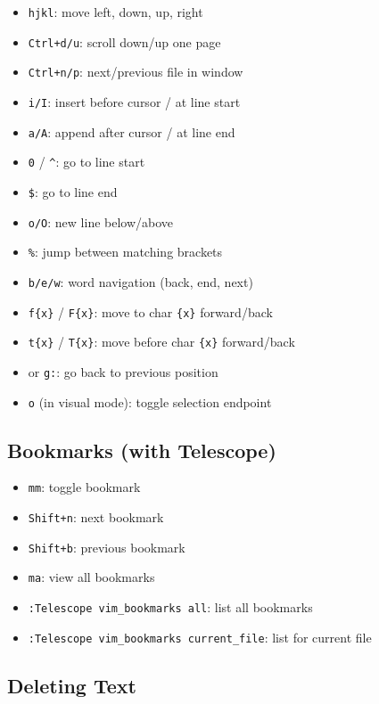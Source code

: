 \documentclass[
  letterpaper,
  DIV=11,
  numbers=noendperiod]{scrartcl}
\providecommand{\tightlist}{%
  \setlength{\itemsep}{0pt}\setlength{\parskip}{0pt}}\usepackage{longtable,booktabs,array}
\begin{document}
\begin{itemize}
\tightlist
\item
  \texttt{hjkl}: move left, down, up, right
\item
  \texttt{Ctrl+d/u}: scroll down/up one page
\item
  \texttt{Ctrl+n/p}: next/previous file in window
\item
  \texttt{i/I}: insert before cursor / at line start
\item
  \texttt{a/A}: append after cursor / at line end
\item
  \texttt{0} / \texttt{\^{}}: go to line start
\item
  \texttt{\$}: go to line end
\item
  \texttt{o/O}: new line below/above
\item
  \texttt{\%}: jump between matching brackets
\item
  \texttt{b/e/w}: word navigation (back, end, next)
\item
  \texttt{f\{x\}} / \texttt{F\{x\}}: move to char \texttt{\{x\}}
  forward/back
\item
  \texttt{t\{x\}} / \texttt{T\{x\}}: move before char \texttt{\{x\}}
  forward/back
\item
  \texttt{\textquotesingle{}\textquotesingle{}} or \texttt{g:}: go back
  to previous position
\item
  \texttt{o} (in visual mode): toggle selection endpoint
\end{itemize}

\subsection{Bookmarks (with Telescope)}\label{bookmarks-with-telescope}

\begin{itemize}
\tightlist
\item
  \texttt{mm}: toggle bookmark
\item
  \texttt{Shift+n}: next bookmark
\item
  \texttt{Shift+b}: previous bookmark
\item
  \texttt{ma}: view all bookmarks
\item
  \texttt{:Telescope\ vim\_bookmarks\ all}: list all bookmarks
\item
  \texttt{:Telescope\ vim\_bookmarks\ current\_file}: list for current
  file
\end{itemize}

\subsection{Deleting Text}\label{deleting-text}
\end{document}
